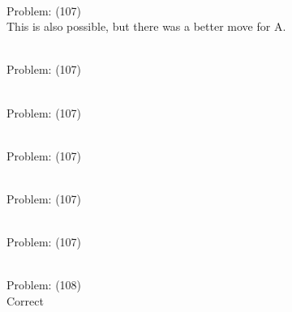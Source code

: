 \documentclass[11pt]{article}
\begin{document}
\begin{minipage}[t]{0.5\textwidth}
  {\centering
  
\\
Problem: (107)\\
This is also possible, but there was a better move for A.\\
  }
\end{minipage}
\begin{minipage}[t]{0.5\textwidth}
  {\centering
  
\\
Problem: (107)\\
  }
\end{minipage}
\begin{minipage}[t]{0.5\textwidth}
  {\centering
  
\\
Problem: (107)\\
  }
\end{minipage}
\begin{minipage}[t]{0.5\textwidth}
  {\centering
  
\\
Problem: (107)\\
  }
\end{minipage}
\begin{minipage}[t]{0.5\textwidth}
  {\centering
  
\\
Problem: (107)\\
  }
\end{minipage}
\begin{minipage}[t]{0.5\textwidth}
  {\centering
  
\\
Problem: (107)\\
  }
\end{minipage}
\begin{minipage}[t]{0.5\textwidth}
  {\centering
  
\\
Problem: (108)\\
Correct\\
  }
\end{minipage}
\end{document}
